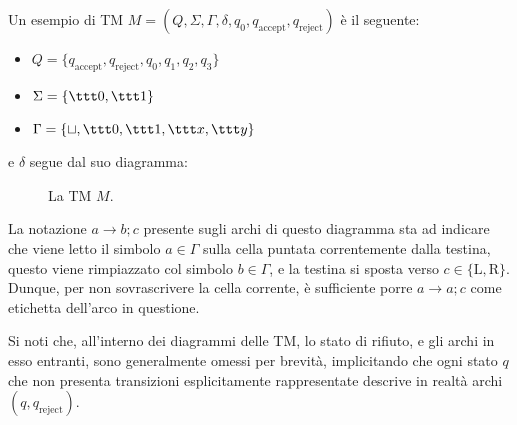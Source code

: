 \documentclass[a4paper, 12pt]{report}
\begin{document}
    \begin{example}[TM]
        \label{tm ex}
        Un esempio di TM $M = (Q, \Sigma, \Gamma, \delta, q_0, q_\mathrm{accept}, q_\mathrm{reject})$ è il seguente:

        \begin{itemize}
            \item $Q = \{q_\mathrm{accept}, q_\mathrm{reject}, q_0, q_1, q_2, q_3\}$
            \item $\Sigma = \{\ttt 0, \ttt 1\}$
            \item $\Gamma = \{\sqcup, \ttt 0, \ttt 1, \ttt x, \ttt y\}$
        \end{itemize}

        e $\delta$ segue dal suo diagramma:

        \begin{figure}[H]
            \centering
             \caption{La TM $M$.}
         \end{figure}
         
         La notazione $a \to b;c$ presente sugli archi di questo diagramma sta ad indicare che viene letto il simbolo $a \in \Gamma$ sulla cella puntata correntemente dalla testina, questo viene rimpiazzato col simbolo $b \in \Gamma$, e la testina si sposta verso $c \in \{\mathrm L, \mathrm R\}$. Dunque, per non sovrascrivere la cella corrente, è sufficiente porre $a \to a; c$ come etichetta dell'arco in questione.
         
         Si noti che, all'interno dei diagrammi delle TM, lo stato di rifiuto, e gli archi in esso entranti, sono generalmente omessi per brevità, implicitando che ogni stato $q$ che non presenta transizioni esplicitamente rappresentate descrive in realtà archi $(q, q_\mathrm{reject})$.
    \end{example}
\end{document}
